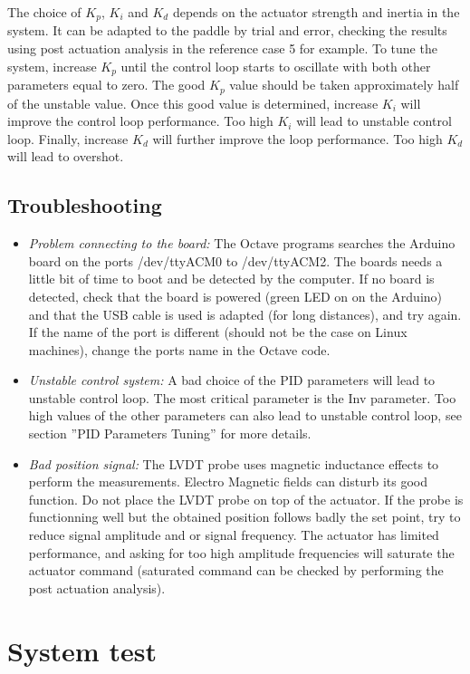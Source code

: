 \documentclass[pdftex,a4paper,12pt,onecolumn,fleqn,captions=tableheading]{scrartcl}
\begin{document}
The choice of $K_p$, $K_i$ and $K_d$ depends on the actuator strength and inertia in the system. It can be adapted to the paddle by trial and error, checking the results using post actuation analysis in the reference case 5 for example. To tune the system, increase $K_p$ until the control loop starts to oscillate with both other parameters equal to zero. The good $K_p$ value should be taken approximately half of the unstable value. Once this good value is determined, increase $K_i$ will improve the control loop performance. Too high $K_i$ will lead to unstable control loop. Finally, increase $K_d$ will further improve the loop performance. Too high $K_d$ will lead to overshot.
 
\subsection{Troubleshooting}

\begin{itemize}
\item \emph{Problem connecting to the board:} The Octave programs searches the Arduino board on the ports /dev/ttyACM0 to /dev/ttyACM2. The boards needs a little bit of time to boot and be detected by the computer. If no board is detected, check that the board is powered (green LED on on the Arduino) and that the USB cable is used is adapted (for long distances), and try again. If the name of the port is different (should not be the case on Linux machines), change the ports name in the Octave code.
\item \emph{Unstable control system:} A bad choice of the PID parameters will lead to unstable control loop. The most critical parameter is the Inv parameter. Too high values of the other parameters can also lead to unstable control loop, see section ''PID Parameters Tuning'' for more details.
\item \emph{Bad position signal:} The LVDT probe uses magnetic inductance effects to perform the measurements. Electro Magnetic fields can disturb its good function. Do not place the LVDT probe on top of the actuator. If the probe is functionning well but the obtained position follows badly the set point, try to reduce signal amplitude and \/ or signal frequency. The actuator has limited performance, and asking for too high amplitude \/ frequencies will saturate the actuator command (saturated command can be checked by performing the post actuation analysis).
\end{itemize}

\section{System test}
\end{document}
